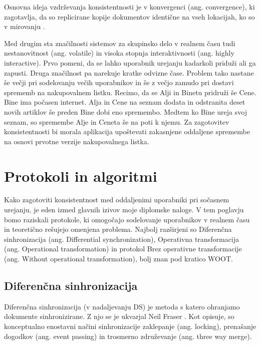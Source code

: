 \documentclass[a4paper, 12pt, twoside]{book}
\begin{document}
Osnovna ideja vzdrževanja konsistentnosti je v konvergenci (ang. convergence), ki zagotavlja, da so replicirane kopije dokumentov identične na vseh lokacijah, ko so v mirovanju \cite{wiki}.

Med drugim sta značilnosti sistemov za skupinsko delo v realnem času \cite{ccigs} tudi nestanovitnost (ang. volatile) in visoka stopnja interaktivnosti (ang. highly interactive). Prvo pomeni, da se lahko uporabnik urejanju kadarkoli priduži ali ga zapusti. Druga značilnost pa narekuje kratke odvizne čase. Problem tako nastane še večji pri sodelovanju večih uporabnikov in še z večjo zamudo pri dostavi sprememb na nakupovalnem listku. Recimo, da se Alji in Binetu pridruži še Cene. Bine ima počasen internet. Alja in Cene na seznam dodata in odstranita deset novih artiklov še preden Bine dobi eno spremembo. Medtem ko Bine ureja svoj seznam, so spremembe Alje in Ceneta še na poti k njemu. Za zagotovitev konsistentnosti bi morala aplikacija upoštevati zakasnjene oddaljene spremembe na osnovi prvotne verzije nakupovalnega listka.

\chapter{Protokoli in algoritmi}
\label{chp:protalg}

Kako zagotoviti konsistentnost med oddaljenimi uporabniki pri sočasnem urejanju, je eden izmed glavnih izivov moje diplomske naloge. V tem poglavju bomo raziskali protokole, ki omogočajo sodelovanje uporabnikov v realnem času in teoretično rešujejo omenjena problema. Najbolj razširjeni so Diferenčna sinhronizacija (ang. Differential synchronization), Operativna transformacija (ang. Operational transformation) in protokol Brez operativne transformacije (ang. Without operational transformation), bolj znan pod kratico WOOT.

\section{Diferenčna sinhronizacija}
\label{sec:ds}

Diferenčna sinhronizacija (v nadaljevanju DS) je metoda s katero ohranjamo dokumente sinhronizirane. Z njo se je ukvarjal Neil Fraser \cite{diffsync}. Kot opisuje, so konceptualno enostavni načini sinhronizacije zaklepanje (ang. locking), prenašanje dogodkov (ang. event passing) in trosmerno združevanje (ang. three way merge).
\end{document}
